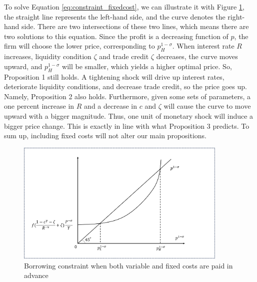 To solve Equation \ref{eq:constraint_fixedcost}, we can illustrate it with Figure \ref{fig: fixed_cost}, the straight line represents the left-hand side, and the curve denotes the right-hand side. There are two intersections of these two lines, which means there are two solutions to this equation. Since the profit is a decreasing function of $p$, the firm will choose the lower price, corresponding to $p_H^{1-\sigma}$. When interest rate $R$ increases, liquidity condition $\zeta$ and trade credit $\zeta$ decreases, the curve moves upward, and $p_H^{1-\sigma}$ will be smaller, which yields a higher optimal price. So, Proposition 1 still holds. A tightening shock will drive up interest rates, deteriorate liquidity conditions, and decrease trade credit, so the price goes up. Namely, Proposition 2 also holds. Furthermore, given some sets of parameters, a one percent increase in $R$ and a decrease in $c$ and $\zeta$ will cause the curve to move upward with a bigger magnitude. Thus, one unit of monetary shock will induce a bigger price change. This is exactly in line with what Proposition 3 predicts. To sum up, including fixed costs will not alter our main propositions.

\begin{figure}[H]
     \centering
         \includegraphics[width=0.9\textwidth]{latex/drafts/pic/fixed_cost.png}
         \caption{\small Borrowing constraint when both variable and fixed costs are paid in advance}
         \label{fig: fixed_cost}
\end{figure}

